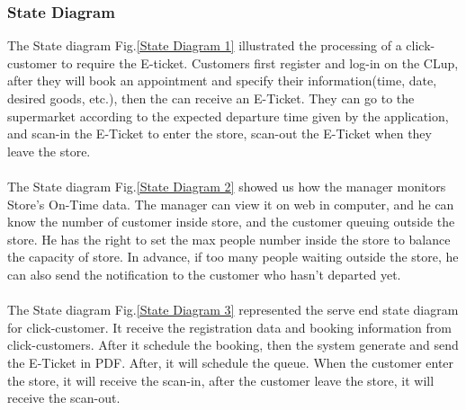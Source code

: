 \documentclass[a4paper,12pt]{report}
\begin{document}
\subsubsection{State Diagram}
The State diagram Fig.\ref{State Diagram 1} illustrated the processing of a click-customer to require the E-ticket. Customers first register and log-in on the CLup, after they will book an appointment and specify their information(time, date, desired goods, etc.), then the can receive an E-Ticket. They can go to the supermarket according to the expected departure time given by the application, and scan-in the E-Ticket to enter the store, scan-out the E-Ticket when they leave the store.
\\ \hspace*{\fill} \\
The State diagram Fig.\ref{State Diagram 2} showed us how the manager monitors Store's On-Time data. The manager can view it on web in computer, and he can know the number of customer inside store, and the customer queuing outside the store. He has the right to set the max people number inside the store to balance the capacity of store. In advance, if too many people waiting outside the store, he can also send the notification to the customer who hasn't departed yet.
\\ \hspace*{\fill} \\
The State diagram Fig.\ref{State Diagram 3} represented the serve end state diagram for click-customer. It receive the registration data and booking information from click-customers. After it schedule the booking, then the system generate and send the E-Ticket in PDF. After, it will schedule the queue. When the customer enter the store, it will receive the scan-in, after the customer leave the store, it will receive the scan-out.
\end{document}
